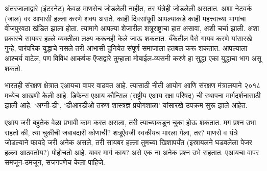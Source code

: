 अंतरजालाद्वारे (इंटरनेट) केवळ माणसेच जोडलेली नाहीत, तर यंत्रेही जोडलेली असतात. अशा नेटवर्क (जाल) वर आभासी हल्ला करणे शक्य असते. काही दिवसांपूर्वी आपल्याकडे काही महत्त्वाच्या भागांचा वीजपुरवठा खंडित झाला होता. त्यामागे आपल्या शेजारील शत्रूराष्ट्राचा हात असावा, अशी चर्चा झाली. अशा प्रकारचे सायबर हल्ले व्यक्तीला लक्ष्य करूनही केले जाऊ शकतात. बँकेतील पैसे गायब करणे यांसारखे गुन्हे, पारंपरिक युद्धाचे नसले तरी आभासी दुनियेत संपूर्ण समाजाला हतबल करू शकतात. आपल्याला आश्चर्य वाटेल, पण विविध आकर्षक ऍप्सद्वारे तुम्हाला मोबाईल-व्यसनी करणे हा सुद्धा एका युद्धाचा भाग असू शकतो.

भारतही संरक्षण क्षेत्रात एआयचा वापर वाढवत आहे. त्यासाठी नीती आयोग आणि संरक्षण मंत्रालयाने २०१८ मध्येच आखणी केली आहे.  डिफेन्स एआय कौन्सिल (राष्ट्रीय एआय रक्षा परिषद) ची स्थापना मार्गदर्शनासाठी झाली आहे. `अग्नी-डी', `डीआरडीओ तरुण शास्त्रज्ञ प्रयोगशाळा' यांसारखे उपक्रम सुरू झाले आहेत.

एआय जरी बहुतेक वेळा प्रभावी काम करत असला, तरी त्याच्याकडून चुका होऊ शकतात. मग प्रश्न उभा राहतो की, त्या चुकीची जबाबदारी कोणाची? शत्रूऐवजी स्वकीयच मारला गेला, तर? माणसे व यंत्रे जोडल्याने फायदे जरी अनेक असले, तरी सायबर हल्ला तुमच्या खिशापर्यंत (इस्रायलने घडवलेला पेजर हल्ला आठवतोय?) पोहोचतो आहे. यावर मार्ग काय? असे एक ना अनेक प्रश्न उभे राहतात. एआयचा वापर समजून-उमजून, सजगपणेच केला पाहिजे.